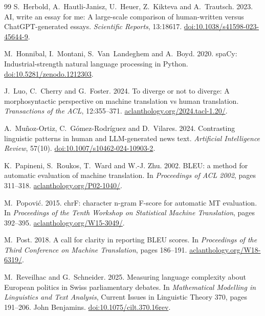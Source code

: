 \documentclass[11pt,a4paper]{article}
\begin{document}
\begin{thebibliography}{99}
S.~Herbold, A.~Hautli-Janisz, U.~Heuer, Z.~Kikteva and A.~Trautsch. 2023. AI,
write an essay for me: A large-scale comparison of human-written versus
ChatGPT-generated essays. \emph{Scientific Reports}, 13:18617.
\href{https://doi.org/10.1038/s41598-023-45644-9}{doi:10.1038/s41598-023-45644-9}.

M.~Honnibal, I.~Montani, S.~Van~Landeghem and A.~Boyd. 2020. spaCy:
Industrial-strength natural language processing in Python.
\href{https://doi.org/10.5281/zenodo.1212303}{doi:10.5281/zenodo.1212303}.

J.~Luo, C.~Cherry and G.~Foster. 2024. To diverge or not to diverge: A
morphosyntactic perspective on machine translation vs human translation.
\emph{Transactions of the ACL}, 12:355--371. \href{https://aclanthology.org/2024.tacl-1.20/}{aclanthology.org/2024.tacl-1.20/}.

A.~Mu{\~n}oz-Ortiz, C.~G{\'o}mez-Rodr{\'i}guez and D.~Vilares. 2024. Contrasting
linguistic patterns in human and LLM-generated news text. \emph{Artificial
Intelligence Review}, 57(10). \href{https://doi.org/10.1007/s10462-024-10903-2}{doi:10.1007/s10462-024-10903-2}.

K.~Papineni, S.~Roukos, T.~Ward and W.-J. Zhu. 2002. BLEU: a method for automatic
evaluation of machine translation. In \emph{Proceedings of ACL 2002}, pages
311--318. \href{https://aclanthology.org/P02-1040/}{aclanthology.org/P02-1040/}.

M.~Popovi{\'c}. 2015. chrF: character n-gram F-score for automatic MT evaluation.
In \emph{Proceedings of the Tenth Workshop on Statistical Machine Translation},
pages 392--395. \href{https://aclanthology.org/W15-3049/}{aclanthology.org/W15-3049/}.

M.~Post. 2018. A call for clarity in reporting BLEU scores. In \emph{Proceedings
of the Third Conference on Machine Translation}, pages 186--191. \href{https://aclanthology.org/W18-6319/}{aclanthology.org/W18-6319/}.

M.~Reveilhac and G.~Schneider. 2025. Measuring language complexity about
European politics in Swiss parliamentary debates. In \emph{Mathematical
Modelling in Linguistics and Text Analysis}, Current Issues in Linguistic Theory
370, pages 191--206. John Benjamins. \href{https://doi.org/10.1075/cilt.370.16rev}{doi:10.1075/cilt.370.16rev}.


\end{thebibliography}
\end{document}
